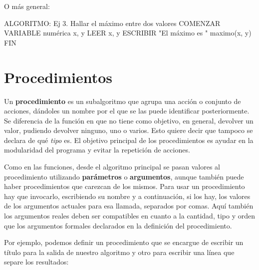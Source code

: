 \documentclass[
]{book}
\newenvironment{Shaded}{\begin{snugshade}}{\end{snugshade}}
\newcommand{\NormalTok}[1]{#1}
\begin{document}
O más general:

\begin{Shaded}
\begin{Highlighting}[]
\NormalTok{ALGORITMO: Ej 3. Hallar el máximo entre dos valores}
\NormalTok{COMENZAR}
\NormalTok{    VARIABLE numérica x, y}
\NormalTok{    LEER x, y}
\NormalTok{    ESCRIBIR "El máximo es " maximo(x, y)}
\NormalTok{FIN}
\end{Highlighting}
\end{Shaded}

\hypertarget{procedimientos}{%
\section{Procedimientos}\label{procedimientos}}

Un \textbf{procedimiento} es un subalgoritmo que agrupa una acción o conjunto de acciones, dándoles un nombre por el que se las puede identificar posteriormente. Se diferencia de la función en que no tiene como objetivo, en general, devolver un valor, pudiendo devolver ninguno, uno o varios. Esto quiere decir que tampoco se declara de qué \emph{tipo} es. El objetivo principal de los procedimientos es ayudar en la modularidad del programa y evitar la repetición de acciones.

Como en las funciones, desde el algoritmo principal se pasan valores al procedimiento utilizando \textbf{parámetros} o \textbf{argumentos}, aunque también puede haber procedimientos que carezcan de los mismos. Para usar un procedimiento hay que invocarlo, escribiendo su nombre y a continuación, si los hay, los valores de los argumentos actuales para esa llamada, separados por comas. Aquí también los argumentos reales deben ser compatibles en cuanto a la cantidad, tipo y orden que los argumentos formales declarados en la definición del procedimiento.

Por ejemplo, podemos definir un procedimiento que se encargue de escribir un título para la salida de nuestro algoritmo y otro para escribir una línea que separe los resultados:
\end{document}
